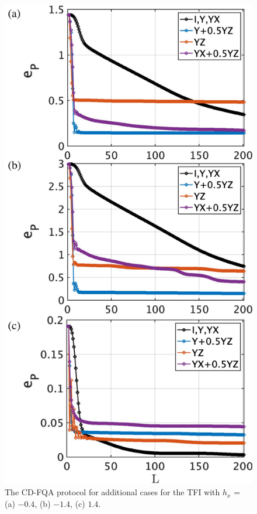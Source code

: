\documentclass[twocolumn,aps,superscriptaddress,floatfix,longbibliography]{revtex4-2}
\begin{document}
\begin{figure}[h!]
    \centering
    \includegraphics[scale=0.2]{TFIadd.pdf}
\caption{
   The CD-FQA protocol for additional cases for the TFI with
   $h_x$ = (a) $-0.4$, (b) $-1.4$,  (c) $1.4$.
}\label{fig:TFIappendix1}
\end{figure}
\end{document}
